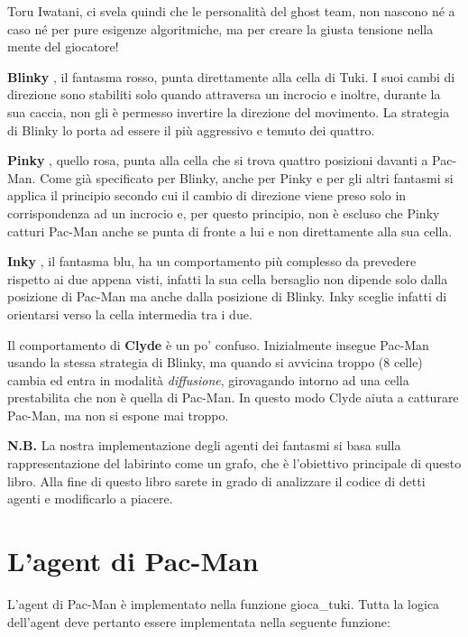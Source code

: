 \documentclass[8pt]{book}
\begin{document}

Toru Iwatani, ci svela quindi che le personalità del ghost team, non nascono né a caso né per pure esigenze algoritmiche, ma per creare la giusta tensione nella mente del giocatore!

\textbf{Blinky} , il fantasma rosso, punta direttamente alla cella di Tuki. I suoi cambi di direzione sono stabiliti solo quando attraversa un incrocio e inoltre, durante la sua caccia, non gli è permesso invertire la direzione del movimento. La strategia di Blinky lo porta ad essere il più aggressivo e temuto dei quattro.

\textbf{Pinky} , quello rosa, punta alla cella che si trova quattro posizioni davanti a Pac-Man. Come già specificato per Blinky, anche per Pinky e per gli altri fantasmi si applica il principio secondo cui il cambio di direzione viene preso solo in corrispondenza ad un incrocio e, per questo principio, non è escluso che Pinky catturi Pac-Man anche se punta di fronte a lui e non direttamente alla sua cella.

\textbf{Inky} , il fantasma blu, ha un comportamento più complesso da prevedere rispetto ai due appena visti, infatti la sua cella bersaglio non dipende solo dalla posizione di Pac-Man ma anche dalla posizione di Blinky. Inky sceglie infatti di orientarsi verso la cella intermedia tra i due.

Il comportamento di \textbf{Clyde} è un po' confuso. Inizialmente insegue Pac-Man usando la stessa strategia di Blinky, ma quando si avvicina troppo (8 celle) cambia ed entra in modalità \emph{diffusione}, girovagando intorno ad una cella prestabilita che non è quella di Pac-Man. In questo modo Clyde aiuta a catturare Pac-Man, ma non si espone mai troppo.

\textbf{N.B.} La nostra implementazione degli agenti dei fantasmi si basa sulla rappresentazione del labirinto come un grafo, che è l'obiettivo principale di questo libro. Alla fine di questo libro sarete in grado di analizzare il codice di detti agenti e modificarlo a piacere.

\newpage
\section{L'agent di Pac-Man}

L'agent di Pac-Man è implementato nella funzione gioca\_tuki. Tutta la logica dell'agent deve pertanto essere implementata nella seguente funzione:\\
\end{document}
